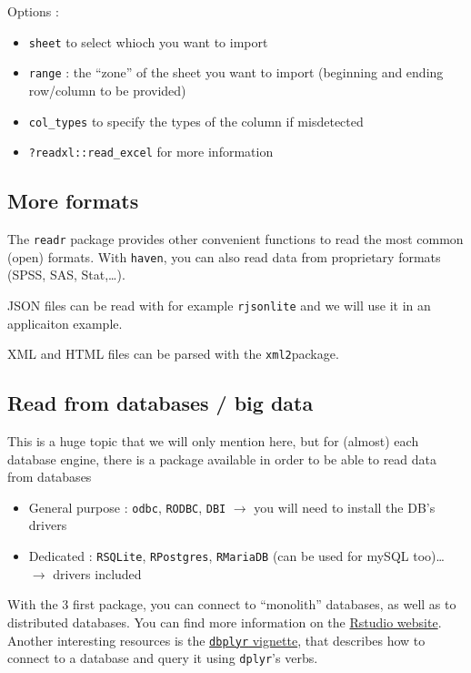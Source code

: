 \documentclass[
]{book}
\providecommand{\tightlist}{%
  \setlength{\itemsep}{0pt}\setlength{\parskip}{0pt}}
\begin{document}
Options :

\begin{itemize}
\tightlist
\item
  \texttt{sheet} to select whioch you want to import
\item
  \texttt{range} : the ``zone'' of the sheet you want to import (beginning and ending row/column to be provided)
\item
  \texttt{col\_types} to specify the types of the column if misdetected
\item
  \texttt{?readxl::read\_excel} for more information
\end{itemize}

\hypertarget{more-formats}{%
\subsection{More formats}\label{more-formats}}

The \texttt{readr} package provides other convenient functions to read the most common (open) formats. With \texttt{haven}, you can also read data from proprietary formats (SPSS, SAS, Stat,\ldots).

JSON files can be read with for example \texttt{rjsonlite} and we will use it in an applicaiton example.

XML and HTML files can be parsed with the \texttt{xml2}package.

\hypertarget{read-from-databases-big-data}{%
\subsection{Read from databases / big data}\label{read-from-databases-big-data}}

This is a huge topic that we will only mention here, but for (almost) each database engine, there is a package available in order to be able to read data from databases

\begin{itemize}
\tightlist
\item
  General purpose : \texttt{odbc}, \texttt{RODBC}, \texttt{DBI} \(\rightarrow\) you will need to install the DB's drivers
\item
  Dedicated : \texttt{RSQLite}, \texttt{RPostgres}, \texttt{RMariaDB} (can be used for mySQL too)\ldots{} \(\rightarrow\) drivers included
\end{itemize}

With the 3 first package, you can connect to ``monolith'' databases, as well as to distributed databases. You can find more information on the \href{https://db.rstudio.com/}{Rstudio website}. Another interesting resources is the \href{https://cran.r-project.org/web/packages/dbplyr/vignettes/dbplyr.html}{\texttt{dbplyr} vignette}, that describes how to connect to a database and query it using \texttt{dplyr}'s verbs.
\end{document}

